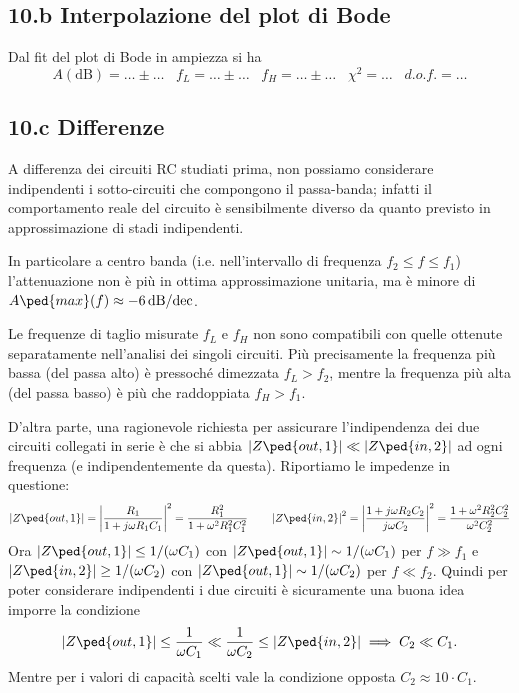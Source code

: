 \documentclass[10pt,a4paper]{article}
\begin{document}
\subsection*{10.b Interpolazione del plot di Bode}
Dal fit del plot di Bode in ampiezza si ha
\[
A(\mathrm{dB}) = \ldots \pm \ldots \;\;\;f_{L} = \ldots\pm \ldots\;\;\;f_{H} = 
\ldots\pm 
\ldots\;\;\;\chi^2 = \ldots\;\;\; d.o.f.= \ldots
\]
\subsection*{10.c Differenze}
A differenza dei circuiti RC studiati prima, non possiamo considerare
indipendenti i sotto-circuiti che compongono il passa-banda; infatti il
comportamento reale del circuito è sensibilmente diverso da quanto previsto in 
approssimazione di stadi indipendenti.

In particolare a centro banda (i.e. nell'intervallo di frequenza
$f_2 \leq f \leq f_1$) l'attenuazione non è più in ottima approssimazione
unitaria, ma è minore di $A\ped{max}(f) \approx \SI{-6}{\dB/dec}$.

Le frequenze di taglio misurate $f_L$ e $f_H$ non sono compatibili con quelle
ottenute separatamente nell'analisi dei singoli circuiti. Più precisamente
la frequenza più bassa (del passa alto) è pressoché dimezzata
$f_L > f_2$, mentre la frequenza più alta (del passa basso) è più che
raddoppiata $f_H > f_1$.

D'altra parte, una ragionevole richiesta per assicurare l'indipendenza dei due
circuiti collegati in serie è che si abbia
$\abs{Z\ped{out, 1}} \ll \abs{Z\ped{in,2}}$ ad ogni frequenza (e 
indipendentemente da questa). Riportiamo le impedenze in questione:
\[
\abs{Z\ped{out, 1}} = \abs{\frac{R_1}{1 + j \omega R_1 C_1}}^2 = 
\frac{R_1^2}{1 + \omega^2 R_1^2 C_1^2}
\qquad
\abs{Z\ped{in, 2}}^2 = \abs{\frac{1 + j \omega R_2 C_2}{j\omega 
C_2}}^2 = \frac{1 + \omega^2 R_2^2 C_2^2}{\omega^2 C_2^2}
\]
Ora $\abs{Z\ped{out, 1}} \leq 1/(\omega C_1)$ con $\abs{Z\ped{out, 
1}} \sim 1/(\omega C_1)$ per $f \gg f_1 $ e $\abs{Z\ped{in, 2}} 
\geq 1/(\omega C_2)$ con $\abs{Z\ped{out, 1}} \sim 1/(\omega C_2) 
$ per $ f \ll f_2 $. Quindi per poter considerare indipendenti i due circuiti
è sicuramente una buona idea imporre la condizione
\[
\abs{Z\ped{out, 1}} \leq \frac{1}{\omega C_1} \ll \frac{1}{\omega C_2} \leq 
\abs{Z\ped{in, 2}} \implies C_2 \ll C_1.
\]
Mentre per i valori di capacità scelti vale la condizione opposta
$C_2 \approx 10 \cdot C_1$.
\end{document}

